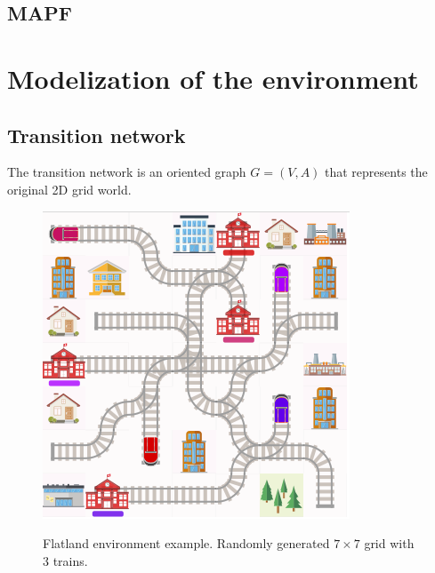 \documentclass[14pt,a4paper]{article}
\theoremstyle{definition}
\numberwithin{equation}{subsection}
\begin{document}
\subsection{MAPF}


\newpage
\section{Modelization of the environment}
\subsection{Transition network}

The transition network is an oriented graph $G = (V,A)$ that represents the original 2D grid world.

\begin{figure}[h]
	\begin{minipage}{0.475\linewidth}
		\centering
		\includegraphics[width=\linewidth]{img/firstgraph2Dworld.png}
		\label{fig:env}
		\vspace{0cm}
		\caption{Flatland environment example. Randomly generated $7\times 7$ grid with 3 trains.}
	\end{minipage}
	\hfill
	\begin{minipage}{0.5\linewidth}
		\centering

\end{minipage}
\end{figure}
\end{document}
